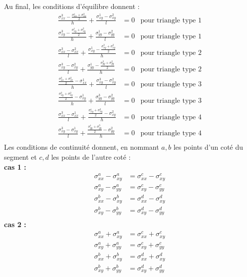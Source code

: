 Au final, les conditions d'équilibre donnent : 
\begin{align*}
\frac{\sigma_{xx}^3 - \frac{\sigma_{xx}^1+\sigma_{xx}^2}{2}}{h} + \frac{\sigma_{xy}^1-\sigma_{xy}^2}{l}&=0 & \text{pour triangle type 1}\\
\frac{\sigma_{xy}^3 - \frac{\sigma_{xy}^1+\sigma_{xy}^2}{2}}{h} + \frac{\sigma_{yy}^1-\sigma_{yy}^2}{l}&=0& \text{pour triangle type 1}\\
\frac{\sigma_{xx}^3-\sigma_{xx}^2}{l} + \frac{\sigma_{xy}^1 - \frac{\sigma_{xy}^3+\sigma_{xy}^2}{2}}{h} &=0& \text{pour triangle type 2}\\
\frac{\sigma_{xy}^3-\sigma_{xy}^2}{l} + \frac{\sigma_{yy}^1 - \frac{\sigma_{yy}^3+\sigma_{yy}^2}{2}}{h} &=0 & \text{pour triangle type 2}\\
\frac{\frac{\sigma_{xx}^3+\sigma_{xx}^2}{2} - \sigma_{xx}^1 }{h} + \frac{\sigma_{xy}^3-\sigma_{xy}^2}{l}&=0& \text{pour triangle type 3}\\
\frac{\frac{\sigma_{xy}^3+\sigma_{xy}^2}{2} - \sigma_{xy}^1 }{h} + \frac{\sigma_{yy}^3-\sigma_{yy}^2}{l}&=0& \text{pour triangle type 3}\\
\frac{\sigma_{xx}^3-\sigma_{xx}^1}{l} + \frac{\frac{\sigma_{xy}^1+\sigma_{xy}^3}{2} - \sigma_{xy}^2 }{h} &=0 & \text{pour triangle type 4}\\
\frac{\sigma_{xy}^3-\sigma_{xy}^1}{l} + \frac{\frac{\sigma_{yy}^1+\sigma_{yy}^3}{2} - \sigma_{yy}^2 }{h} &=0 & \text{pour triangle type 4}\\
\end{align*}
Les conditions de continuité donnent, en nommant $a,b$ les points d'un coté du segment et $c,d$ les points de l'autre coté : \\
\textbf{cas 1 : }
\begin{align*}
\sigma_{xx}^a - \sigma_{xy}^a &= \sigma_{xx}^c - \sigma_{xy}^c \\
 \sigma_{xy}^a - \sigma_{yy}^a &= \sigma_{xy}^c - \sigma_{yy}^c \\
 \sigma_{xx}^b - \sigma_{xy}^b &= \sigma_{xx}^d - \sigma_{xy}^d \\
 \sigma_{xy}^b - \sigma_{yy}^b &= \sigma_{xy}^d - \sigma_{yy}^d \\
\end{align*}
\textbf{cas 2 :}
\begin{align*}
\sigma_{xx}^a + \sigma_{xy}^a &= \sigma_{xx}^c + \sigma_{xy}^c \\
 \sigma_{xy}^a + \sigma_{yy}^a &= \sigma_{xy}^c + \sigma_{yy}^c \\
 \sigma_{xx}^b +\sigma_{xy}^b &= \sigma_{xx}^d + \sigma_{xy}^d \\
 \sigma_{xy}^b + \sigma_{yy}^b &= \sigma_{xy}^d + \sigma_{yy}^d \\
\end{align*}

